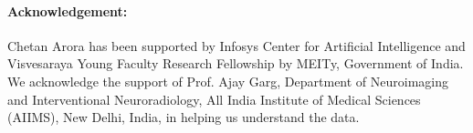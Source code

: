\documentclass{article}
\begin{document}
\paragraph*{Acknowledgement:}

Chetan Arora has been supported by Infosys Center for Artificial Intelligence and Visvesaraya Young Faculty Research Fellowship by MEITy, Government of India. We acknowledge the support of Prof. Ajay Garg, Department of Neuroimaging and Interventional Neuroradiology, All India Institute of Medical Sciences (AIIMS), New Delhi, India, in helping us understand the data.
    


\end{document}
